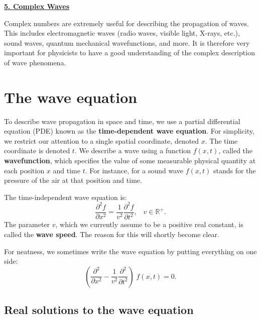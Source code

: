 \documentclass[10pt,a4paper]{article}
\begin{document}
\setcounter{page}{35}
\noindent
\underline{\textbf{\LARGE 5. Complex Waves}}
\vskip 0.1in

Complex numbers are extremely useful for describing the propagation of
waves. This includes electromagnetic waves (radio waves, visible
light, X-rays, etc.), sound waves, quantum mechanical wavefunctions,
and more.  It is therefore very important for physicists to have a
good understanding of the complex description of wave phenomena.

\section{The wave equation}
\label{the-wave-equation}

To describe wave propagation in space and time, we use a partial
differential equation (PDE) known as the \textbf{time-dependent wave
  equation}. For simplicity, we restrict our attention to a single
spatial coordinate, denoted $x$.  The time coordinate is denoted
$t$. We describe a wave using a function $f(x,t)$, called the
\textbf{wavefunction}, which specifies the value of some measurable
physical quantity at each position $x$ and time $t$. For instance, for
a sound wave $f(x,t)$ stands for the pressure of the air at that
position and time.

The time-independent wave equation is:
\begin{equation}
  \frac{\partial^2 f}{\partial x^2}
  = \frac{1}{v^2} \frac{\partial^2 f}{\partial t^2}, \;\;\; v \in\mathbb{R}^+.
  \label{wavepde}
\end{equation}
The parameter $v$, which we currently assume to be a positive real
constant, is called the \textbf{wave speed}.  The reason for this will
shortly become clear.

For neatness, we sometimes write the wave
equation by putting everything on one side:
\begin{equation}
  \left(\frac{\partial^2}{\partial x^2} - \frac{1}{v^2} \frac{\partial^2}{\partial t^2}\right) \; f(x,t) = 0.
\end{equation}

\subsection{Real solutions to the wave equation}
\label{real-solutions-to-the-wave-equation}
\end{document}
